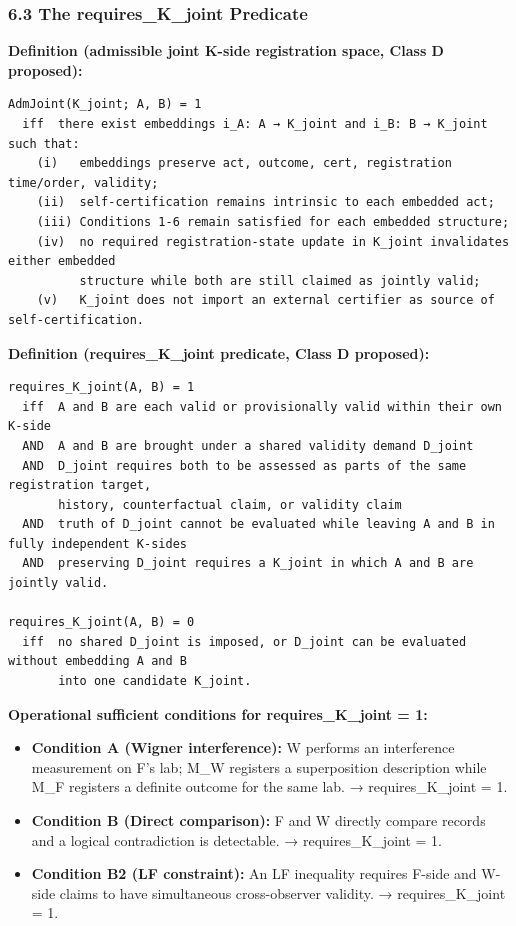 \documentclass[
  11pt,
]{article}
\providecommand{\tightlist}{%
  \setlength{\itemsep}{0pt}\setlength{\parskip}{0pt}}
\begin{document}
\subsubsection{6.3 The requires\_K\_joint
Predicate}\label{the-requires_k_joint-predicate}

\textbf{Definition (admissible joint K-side registration space, Class D
proposed):}

\begin{verbatim}
AdmJoint(K_joint; A, B) = 1
  iff  there exist embeddings i_A: A → K_joint and i_B: B → K_joint such that:
    (i)   embeddings preserve act, outcome, cert, registration time/order, validity;
    (ii)  self-certification remains intrinsic to each embedded act;
    (iii) Conditions 1-6 remain satisfied for each embedded structure;
    (iv)  no required registration-state update in K_joint invalidates either embedded
          structure while both are still claimed as jointly valid;
    (v)   K_joint does not import an external certifier as source of self-certification.
\end{verbatim}

\textbf{Definition (requires\_K\_joint predicate, Class D proposed):}

\begin{verbatim}
requires_K_joint(A, B) = 1
  iff  A and B are each valid or provisionally valid within their own K-side
  AND  A and B are brought under a shared validity demand D_joint
  AND  D_joint requires both to be assessed as parts of the same registration target,
       history, counterfactual claim, or validity claim
  AND  truth of D_joint cannot be evaluated while leaving A and B in fully independent K-sides
  AND  preserving D_joint requires a K_joint in which A and B are jointly valid.

requires_K_joint(A, B) = 0
  iff  no shared D_joint is imposed, or D_joint can be evaluated without embedding A and B
       into one candidate K_joint.
\end{verbatim}

\textbf{Operational sufficient conditions for requires\_K\_joint = 1:}

\begin{itemize}
\tightlist
\item
  \textbf{Condition A (Wigner interference):} W performs an interference
  measurement on F's lab; M\_W registers a superposition description
  while M\_F registers a definite outcome for the same lab. →
  requires\_K\_joint = 1.
\item
  \textbf{Condition B (Direct comparison):} F and W directly compare
  records and a logical contradiction is detectable. →
  requires\_K\_joint = 1.
\item
  \textbf{Condition B2 (LF constraint):} An LF inequality requires
  F-side and W-side claims to have simultaneous cross-observer validity.
  → requires\_K\_joint = 1.
\end{itemize}
\end{document}
